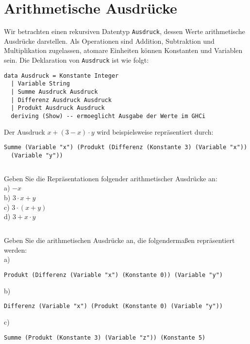 \documentclass[
  10pt,                   %
  DIV12,
  german,                 %
  oneside,                %
  parskip=half,           %
  headings=normal,        %
  captions=tableheading,  %
]{scrartcl}
\begin{document}
\section{Arithmetische Ausdrücke}
Wir betrachten einen rekursiven Datentyp \lstinline|Ausdruck|, dessen Werte arithmetische Ausdrücke darstellen. Als Operationen sind Addition, Subtraktion und Multiplikation zugelassen, atomare Einheiten können Konstanten und Variablen sein. Die Deklaration
von \lstinline|Ausdruck| ist wie folgt:
\begin{lstlisting}
data Ausdruck = Konstante Integer
  | Variable String
  | Summe Ausdruck Ausdruck
  | Differenz Ausdruck Ausdruck
  | Produkt Ausdruck Ausdruck
  deriving (Show) -- ermoeglicht Ausgabe der Werte im GHCi
\end{lstlisting}
Der Ausdruck $x + (3 - x) \cdot y$ wird beispielsweise repräsentiert durch:
\begin{lstlisting}
Summe (Variable "x") (Produkt (Differenz (Konstante 3) (Variable "x")) 
  (Variable "y"))
\end{lstlisting}
\subsection{}
Geben Sie die Repräsentationen folgender arithmetischer Ausdrücke an:\\
a) $-x$\\
b) $3 \cdot x + y$\\
c) $3 \cdot (x + y)$\\
d) $3 + x \cdot y$
\subsection{}
Geben Sie die arithmetischen Ausdrücke an, die folgendermaßen repräsentiert
werden:\\
a) \begin{lstlisting}
Produkt (Differenz (Variable "x") (Konstante 0)) (Variable "y")
\end{lstlisting}
b) \begin{lstlisting}
Differenz (Variable "x") (Produkt (Konstante 0) (Variable "y"))
\end{lstlisting}
c) \begin{lstlisting}
Summe (Produkt (Konstante 3) (Variable "z")) (Konstante 5)
\end{lstlisting}
\end{document}

